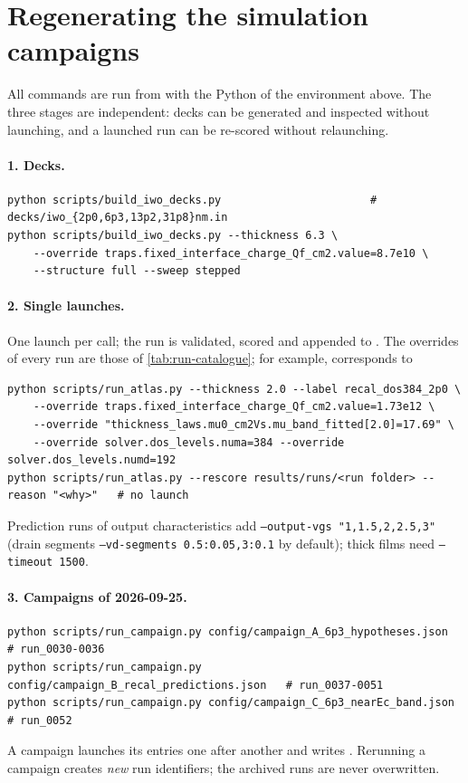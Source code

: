\section{Regenerating the simulation campaigns}\label{sec:repro-campaigns}

All commands are run from  with the Python of the environment above. The three stages are independent: decks
can be generated and inspected without launching, and a launched run can be re-scored without relaunching.

\paragraph{1. Decks.}
\begin{lstlisting}[language={},numbers=none]
python scripts/build_iwo_decks.py                       # decks/iwo_{2p0,6p3,13p2,31p8}nm.in
python scripts/build_iwo_decks.py --thickness 6.3 \
    --override traps.fixed_interface_charge_Qf_cm2.value=8.7e10 \
    --structure full --sweep stepped
\end{lstlisting}

\paragraph{2. Single launches.} One launch per call; the run is validated, scored and appended to
. The overrides of every run are those of \cref{tab:run-catalogue}; for example, 
corresponds to
\begin{lstlisting}[language={},numbers=none]
python scripts/run_atlas.py --thickness 2.0 --label recal_dos384_2p0 \
    --override traps.fixed_interface_charge_Qf_cm2.value=1.73e12 \
    --override "thickness_laws.mu0_cm2Vs.mu_band_fitted[2.0]=17.69" \
    --override solver.dos_levels.numa=384 --override solver.dos_levels.numd=192
python scripts/run_atlas.py --rescore results/runs/<run folder> --reason "<why>"   # no launch
\end{lstlisting}
Prediction runs of output characteristics add \texttt{--output-vgs "1,1.5,2,2.5,3"} (drain segments
\texttt{--vd-segments 0.5:0.05,3:0.1} by default); thick films need \texttt{--timeout 1500}.

\paragraph{3. Campaigns of 2026-09-25.}
\begin{lstlisting}[language={},numbers=none]
python scripts/run_campaign.py config/campaign_A_6p3_hypotheses.json      # run_0030-0036
python scripts/run_campaign.py config/campaign_B_recal_predictions.json   # run_0037-0051
python scripts/run_campaign.py config/campaign_C_6p3_nearEc_band.json     # run_0052
\end{lstlisting}
A campaign launches its entries one after another and writes . Rerunning a campaign
creates \emph{new} run identifiers; the archived runs are never overwritten.

